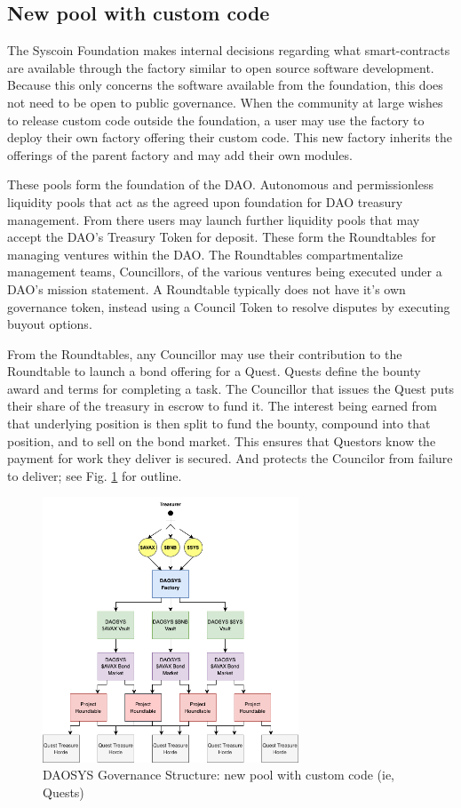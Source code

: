\documentclass[journal,twocolumn,12pt]{ieeesyscoin}
\begin{document}
\subsection{New pool with custom code}

The Syscoin Foundation makes internal decisions regarding what smart-contracts are available through the factory similar to open source software development. Because this only concerns the software available from the foundation, this does not need to be open to public governance. When the community at large wishes to release custom code outside the foundation, a user may use the factory to deploy their own factory offering their custom code. This new factory inherits the offerings of the parent factory and may add their own modules.

These pools form the foundation of the DAO. Autonomous and permissionless liquidity pools that act as the agreed upon foundation for DAO treasury management. From there users may launch further liquidity pools that may accept the DAO's Treasury Token for deposit. These form the Roundtables for managing ventures within the DAO. The Roundtables compartmentalize management teams, Councillors, of the various ventures being executed under a DAO’s mission statement. A Roundtable typically does not have it’s own governance token, instead using a Council Token to resolve disputes by executing buyout options.

From the Roundtables, any Councillor may use their contribution to the Roundtable to launch a bond offering for a Quest. Quests define the bounty award and terms for completing a task. The Councillor that issues the Quest puts their share of the treasury in escrow to fund it. The interest being earned from that underlying position is then split to fund the bounty, compound into that position, and to sell on the bond market. This ensures that Questors know the payment for work they deliver is secured. And protects the Councilor from failure to deliver; see Fig. \ref{fig:daosys_governance} for outline.

\begin{figure}[h!]
\includegraphics[width=3in]{img/governance.png}
\caption{DAOSYS Governance Structure: new pool with custom code (ie, Quests)} 
\label{fig:daosys_governance}
\end{figure} 
\end{document}

